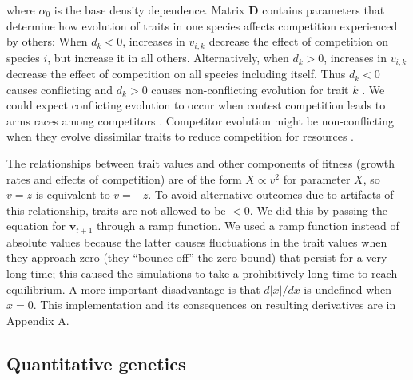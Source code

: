 \noindent where $\alpha_0$ is the base density dependence.
Matrix $\mathbf{D}$ contains parameters that determine how evolution of traits
in one species affects competition experienced by others:
When $d_k < 0$, increases in $v_{i,k}$ decrease the
effect of competition on species $i$, but increase it in all others.
Alternatively, when $d_k > 0$, increases in $v_{i,k}$ decrease the effect of
competition on all species including itself.
Thus $d_k < 0$ causes conflicting and $d_k > 0$ causes non-conflicting evolution
for trait $k$ \citep{Northfield:2013if}.
We could expect conflicting evolution to occur when contest competition
leads to arms races among competitors
\citep{Abrams:1994th}.
Competitor evolution might be non-conflicting when they evolve
dissimilar traits to reduce competition for resources \citep{Roughgarden:1976eh}.


The relationships between trait values and other components of fitness
(growth rates and effects of competition) are of the form
$X \propto v^2$ for parameter $X$, so $v = z$ is equivalent to $v = -z$.
To avoid alternative outcomes due to artifacts of this relationship,
traits are not allowed to be $< 0$.
We did this by passing the equation for $\mathbf{v}_{t+1}$ through a
ramp function.
We used a ramp function instead of absolute values
because the latter causes fluctuations
in the trait values when they approach zero (they ``bounce off''
the zero bound) that persist for a very long time;
this caused the simulations to take a prohibitively long time to reach
equilibrium.
A more important disadvantage is that $d \lvert x \rvert / dx$ is
undefined when $x = 0$.
This implementation and its consequences on resulting derivatives are in
Appendix A.




%


\subsection*{Quantitative genetics}


